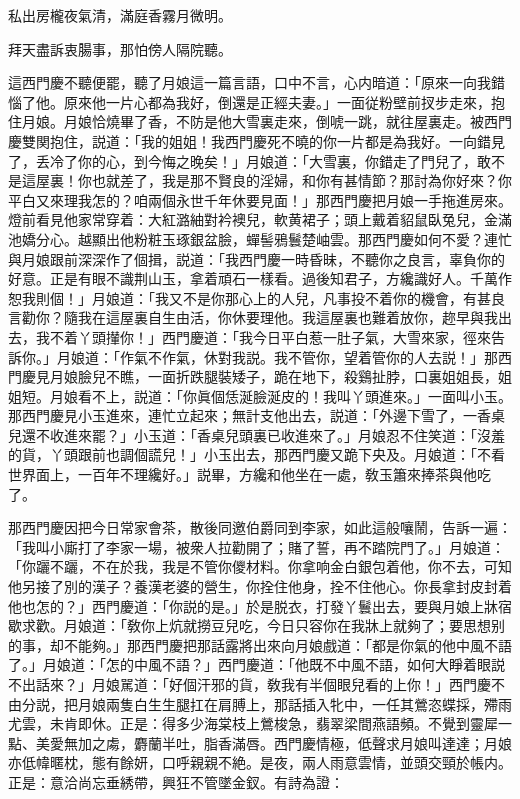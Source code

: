 私出房櫳夜氣清，滿庭香霧月微明。

拜天盡訴衷腸事，那怕傍人隔院聽。

這西門慶不聽便罷，聽了月娘這一篇言語，口中不言，心内暗道：「原來一向我錯惱了他。原來他一片心都為我好，倒還是正經夫妻。」一面従粉壁前扠步走來，抱住月娘。月娘恰燒畢了香，不防是他大雪裏走來，倒唬一跳，就往屋裏走。被西門慶雙関抱住，説道：「我的姐姐！我西門慶死不曉的你一片都是為我好。一向錯見了，丢冷了你的心，到今悔之晚矣！」月娘道：「大雪裏，你錯走了門兒了，敢不是這屋裏！你也就差了，我是那不賢良的淫婦，和你有甚情節？那討為你好來？你平白又來理我怎的？咱兩個永世千年休要見面！」那西門慶把月娘一手拖進房來。燈前看見他家常穿着：大紅潞紬對衿襖兒，軟黄裙子；頭上戴着貂鼠臥兔兒，金滿池嬌分心。越顯出他粉粧玉琢銀盆臉，蟬髻鴉鬟楚岫雲。那西門慶如何不愛？連忙與月娘跟前深深作了個揖，説道：「我西門慶一時昏昧，不聽你之良言，辜負你的好意。正是有眼不識荆山玉，拿着頑石一樣看。過後知君子，方纔識好人。千萬作恕我則個！」月娘道：「我又不是你那心上的人兒，凡事投不着你的機會，有甚良言勸你？隨我在這屋裏自生由活，你休要理他。我這屋裏也難着放你，趂早與我出去，我不着丫頭攆你！」西門慶道：「我今日平白惹一肚子氣，大雪來家，徑來告訴你。」月娘道：「作氣不作氣，休對我説。我不管你，望着管你的人去説！」那西門慶見月娘臉兒不瞧，一面折跌腿裝矮子，跪在地下，殺鷄扯脖，口裏姐姐長，姐姐短。月娘看不上，説道：「你眞個恁涎臉涎皮的！我叫丫頭進來。」一面叫小玉。那西門慶見小玉進來，連忙立起來；無計支他出去，説道：「外邊下雪了，一香桌兒還不收進來罷？」小玉道：「香桌兒頭裏已收進來了。」月娘忍不住笑道：「沒羞的貨，丫頭跟前也調個謊兒！」小玉出去，那西門慶又跪下央及。月娘道：「不看世界面上，一百年不理纔好。」説畢，方纔和他坐在一處，敎玉簫來捧茶與他吃了。

那西門慶因把今日常家會茶，散後同邀伯爵同到李家，如此這般嚷鬧，告訴一遍：「我叫小廝打了李家一場，被衆人拉勸開了；賭了誓，再不踏院門了。」月娘道：「你躧不躧，不在於我，我是不管你儍材料。你拿响金白銀包着他，你不去，可知他另接了別的漢子？養漢老婆的營生，你拴住他身，拴不住他心。你長拿封皮封着他也怎的？」西門慶道：「你説的是。」於是脱衣，打發丫鬟出去，要與月娘上牀宿歇求歡。月娘道：「敎你上炕就撈豆兒吃，今日只容你在我牀上就夠了；要思想别的事，却不能夠。」那西門慶把那話露將出來向月娘戲道：「都是你氣的他中風不語了。」月娘道：「怎的中風不語？」西門慶道：「他既不中風不語，如何大睜着眼説不出話來？」月娘駡道：「好個汗邪的貨，敎我有半個眼兒看的上你！」西門慶不由分説，把月娘兩隻白生生腿扛在肩膊上，那話插入牝中，一任其鶯恣蝶採，殢雨尤雲，未肯即休。正是：得多少海棠枝上鶯梭急，翡翠梁間燕語頻。不覺到靈犀一點、美愛無加之䖏，麝蘭半吐，脂香滿唇。西門慶情極，低聲求月娘叫達達；月娘亦低幃暱枕，態有餘妍，口呼親親不絶。是夜，兩人雨意雲情，並頭交頸於帳内。正是：意洽尚忘垂綉帶，興狂不管墜金釵。有詩為證：

